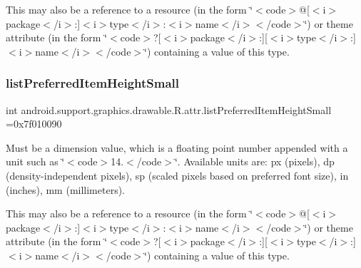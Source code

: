 This may also be a reference to a resource (in the form \char`\"{}$<$code$>$@\mbox{[}$<$i$>$package$<$/i$>$\+:\mbox{]}$<$i$>$type$<$/i$>$\+:$<$i$>$name$<$/i$>$$<$/code$>$\char`\"{}) or theme attribute (in the form \char`\"{}$<$code$>$?\mbox{[}$<$i$>$package$<$/i$>$\+:\mbox{]}\mbox{[}$<$i$>$type$<$/i$>$\+:\mbox{]}$<$i$>$name$<$/i$>$$<$/code$>$\char`\"{}) containing a value of this type. \mbox{\label{classandroid_1_1support_1_1graphics_1_1drawable_1_1R_1_1attr_afb78c67eaaebccb22148e87d0d3290a7}} 
\subsubsection{\texorpdfstring{list\+Preferred\+Item\+Height\+Small}{listPreferredItemHeightSmall}}
{\footnotesize\ttfamily int android.\+support.\+graphics.\+drawable.\+R.\+attr.\+list\+Preferred\+Item\+Height\+Small =0x7f010090\hspace{0.3cm}{\ttfamily [static]}}

Must be a dimension value, which is a floating point number appended with a unit such as \char`\"{}$<$code$>$14.\+5sp$<$/code$>$\char`\"{}. Available units are\+: px (pixels), dp (density-\/independent pixels), sp (scaled pixels based on preferred font size), in (inches), mm (millimeters). 

This may also be a reference to a resource (in the form \char`\"{}$<$code$>$@\mbox{[}$<$i$>$package$<$/i$>$\+:\mbox{]}$<$i$>$type$<$/i$>$\+:$<$i$>$name$<$/i$>$$<$/code$>$\char`\"{}) or theme attribute (in the form \char`\"{}$<$code$>$?\mbox{[}$<$i$>$package$<$/i$>$\+:\mbox{]}\mbox{[}$<$i$>$type$<$/i$>$\+:\mbox{]}$<$i$>$name$<$/i$>$$<$/code$>$\char`\"{}) containing a value of this type. \mbox{\label{classandroid_1_1support_1_1graphics_1_1drawable_1_1R_1_1attr_a81120041ceb924b07988c476b520ddbd}} 
